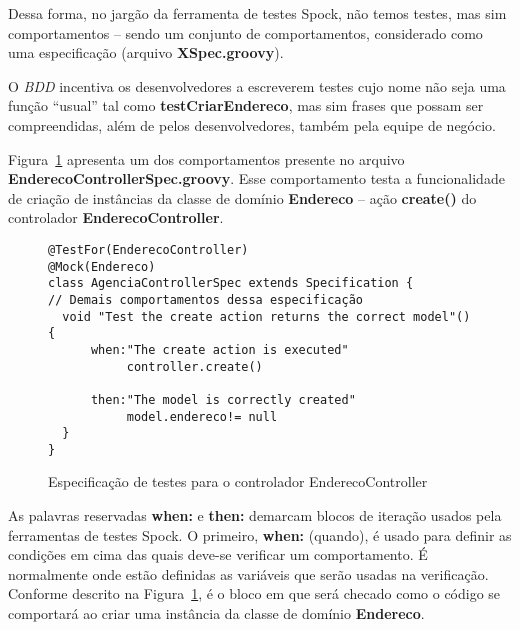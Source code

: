 \vspace{0.2cm}

Dessa forma, no jargão da ferramenta  de testes Spock, não temos testes, mas sim
comportamentos  -- sendo  um conjunto  de comportamentos,  considerado  como uma
especificação (arquivo {\bf XSpec.groovy}).  

\vspace{0.2cm}

O {\it BDD} incentiva os desenvolvedores  a escreverem testes cujo nome não seja
uma função ``usual'' tal como {\bf testCriarEndereco}, mas sim frases que possam
ser  compreendidas,  além  de  pelos  desenvolvedores,  também  pela  equipe  de
negócio.  

\vspace{0.2cm}

Figura~\ref{EndBehaFig} apresenta um dos comportamentos presente no arquivo {\bf
  EnderecoControllerSpec.groovy}.  Esse comportamento  testa a funcionalidade de
criação de instâncias da classe de domínio {\bf Endereco} -- ação {\bf create()}
do controlador {\bf EnderecoController}.  

\vspace{0.2cm}

\begin{figure}[htbp]
\begin{mdframed}
\begin{footnotesize}
\begin{verbatim}
@TestFor(EnderecoController)
@Mock(Endereco)
class AgenciaControllerSpec extends Specification {
// Demais comportamentos dessa especificação
  void "Test the create action returns the correct model"() {
      when:"The create action is executed"
           controller.create()

      then:"The model is correctly created"
           model.endereco!= null
  }
}
\end{verbatim}
\end{footnotesize}
\end{mdframed}
\caption{Especificação de testes para o controlador EnderecoController}
\label{EndBehaFig}
\end{figure}

As palavras  reservadas {\bf  when:} e {\bf  then:} demarcam blocos  de iteração
usados pela  ferramentas de  testes Spock. O  primeiro, {\bf when:}  (quando), é
usado  para  definir  as  condições  em  cima das  quais  deve-se  verificar  um
comportamento. É normalmente onde estão  definidas as variáveis que serão usadas
na verificação. Conforme  descrito na Figura~\ref{EndBehaFig}, é o  bloco em que
será checado  como o código  se comportará ao  criar uma instância da  classe de
domínio {\bf Endereco}.  

